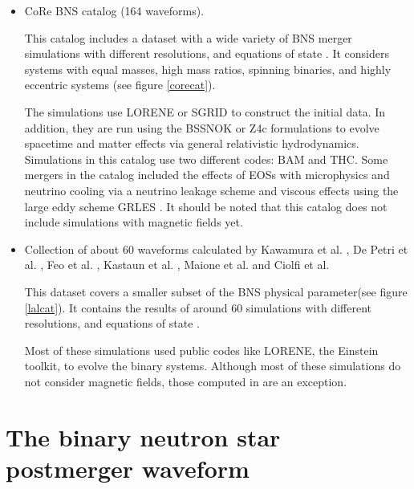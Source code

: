 \begin{itemize}

\item CoRe BNS catalog (164 waveforms).

This catalog includes a dataset with a wide variety of BNS merger simulations with different resolutions, and equations of state \cite{Banik_2014,Steiner:2012rk,PhysRevD.79.124032}. It considers systems with equal masses, high mass ratios, spinning binaries, and highly eccentric systems (see figure \ref{corecat}).

The simulations use LORENE or SGRID to construct the initial data. In addition, they are run using the BSSNOK \cite{PhysRevD.52.5428,1987PThPS..90....1N,Bernuzzi_2010} or Z4c \cite{Ruiz_2011,Weyhausen_2012,Hilditch_2013} formulations to evolve spacetime and matter effects via general relativistic hydrodynamics. Simulations in this catalog use two different codes: BAM and THC. Some mergers in the catalog included the effects of EOSs with microphysics and neutrino cooling via a neutrino leakage scheme and viscous effects using the large eddy scheme GRLES \cite{Radice_2017}. It should be noted that this catalog does not include simulations with magnetic fields yet.

\item Collection of about 60 waveforms calculated by Kawamura et al. \cite{Kawamura:2016nmk}, De Petri et al. \cite{DePietri:2018tpx,DePietri:2015lya}, Feo et al. \cite{Feo:2016cbs}, Kastaun et al. \cite{Kastaun:2016elu}, Maione et al. \cite{Maione:2016zqz,Maione:2017aux} and Ciolfi et al. \cite{Ciolfi:2017uak}

This dataset covers a smaller subset of the BNS physical parameter(see figure \ref{lalcat}). It contains the results of around 60 simulations with different resolutions, and equations of state \cite{PhysRevC.82.015806,PhysRevC.83.035802,PhysRevC.58.1804,PhysRevD.79.124032,PhysRevLett.67.2414,PhysRevC.52.2072}.

Most of these simulations used public codes like LORENE, the Einstein toolkit, to evolve the binary systems. Although most of these simulations do not consider magnetic fields, those computed in \cite{Kawamura:2016nmk,Ciolfi:2017uak} are an exception. 

\end{itemize}



\section{The binary neutron star postmerger waveform}

